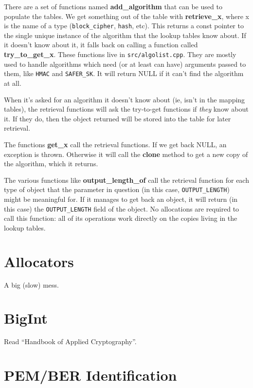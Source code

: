 \documentclass{article}
\newcommand{\filename}[1]{\texttt{#1}}
\newcommand{\function}[1]{\textbf{#1}}
\newcommand{\type}[1]{\texttt{#1}}
\begin{document}
There are a set of functions named \function{add\_algorithm} that can
be used to populate the tables. We get something out of the table with
\function{retrieve\_x}, where x is the name of a type
(\texttt{block\_cipher}, \texttt{hash}, etc). This returns a const
pointer to the single unique instance of the algorithm that the lookup
tables know about. If it doesn't know about it, it falls back on
calling a function called \function{try\_to\_get\_x}. These functions
live in \filename{src/algolist.cpp}. They are mostly used to handle
algorithms which need (or at least can have) arguments passed to them,
like \type{HMAC} and \type{SAFER\_SK}. It will return NULL if it can't
find the algorithm at all.

When it's asked for an algorithm it doesn't know about (ie, isn't in
the mapping tables), the retrieval functions will ask the try-to-get
functions if \emph{they} know about it. If they do, then the object
returned will be stored into the table for later retrieval.

The functions \function{get\_x} call the retrieval functions. If we
get back NULL, an exception is thrown. Otherwise it will call the
\function{clone} method to get a new copy of the algorithm, which it
returns.

The various functions like \function{output\_length\_of} call the
retrieval function for each type of object that the parameter in
question (in this case, \texttt{OUTPUT\_LENGTH}) might be meaningful
for. If it manages to get back an object, it will return (in this
case) the \texttt{OUTPUT\_LENGTH} field of the object. No allocations
are required to call this function: all of its operations work
directly on the copies living in the lookup tables.

\section{Allocators}

A big (slow) mess.

\section{BigInt}

Read ``Handbook of Applied Cryptography''.

\section{PEM/BER Identification}
\end{document}
